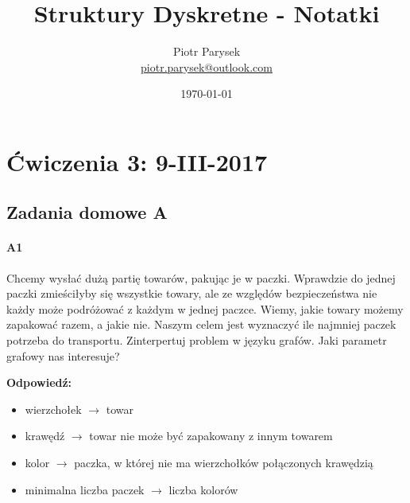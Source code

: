 \documentclass[a4paper,12pt]{article}
\title{Struktury Dyskretne - Notatki}
\author{Piotr Parysek\\
\href{mailto:piotr.parysek@outlook.com}{piotr.parysek@outlook.com} }
\date{\today}
\theoremstyle{definition}%
\theoremstyle{definition}
\theoremstyle{problem}
\begin{document}
\maketitle

\tableofcontents
\section{Ćwiczenia 3: 9-III-2017}
\subsection{Zadania domowe A}
\paragraph{A1} Chcemy wysłać dużą partię towarów, pakując je w paczki. Wprawdzie do jednej paczki zmieściłyby się wszystkie towary, ale ze względów bezpieczeństwa nie każdy może podróżować z każdym w jednej paczce. Wiemy, jakie towary możemy zapakować razem, a jakie nie. Naszym celem jest wyznaczyć ile najmniej paczek potrzeba do transportu. Zinterpertuj problem w języku grafów.  Jaki parametr grafowy nas   interesuje?

\textbf{Odpowiedź:} 
\begin{itemize}
\item wierzchołek $\rightarrow $  towar 
\item krawędź $\rightarrow $ towar nie może być zapakowany z innym towarem
\item kolor $\rightarrow $ paczka, w której nie ma wierzchołków połączonych krawędzią
\item minimalna liczba paczek $\rightarrow $ liczba kolorów
\end{itemize}
\end{document}
